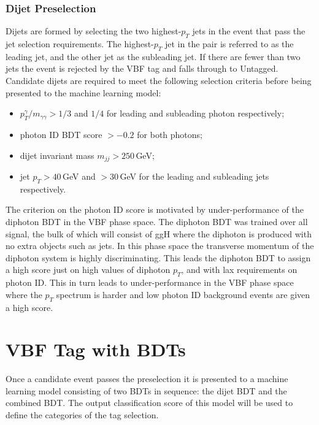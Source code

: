 \subsubsection{Dijet Preselection}
Dijets are formed by selecting the two highest-$p_T$ jets in the event that pass the jet selection requirements. The highest-$p_T$ jet in the pair is referred to as the leading jet, and the other jet as the subleading jet. If there are fewer than two jets the event is rejected by the VBF tag and falls through to Untagged. 
Candidate dijets are required to meet the following selection criteria before being presented to the machine learning model:
\begin{itemize}[noitemsep]
    \item $p^{\gamma}_{T}/m_{\gamma\gamma} > 1/3$ and $1/4$ for leading and subleading photon respectively;
    \item photon ID BDT score $> -0.2$ for both photons;
    \item dijet invariant mass $m_{jj} > 250$\,GeV;
    \item jet $p_{T} > 40$\,GeV and $> 30$\,GeV for the leading and subleading jets respectively.
\end{itemize}

The criterion on the photon ID score is motivated by under-performance of the diphoton BDT in the VBF phase space. 
The diphoton BDT was trained over all signal, the bulk of which will consist of ggH where the diphoton is produced with no extra objects such as jets. 
In this phase space the transverse momentum of the diphoton system is highly discriminating. 
This leads the diphoton BDT to assign a high score just on high values of diphoton $p_T$, and with lax requirements on photon ID. 
This in turn leads to under-performance in the VBF phase space where the $p_T$ spectrum is harder and low photon ID background events are given a high score. 








\section{VBF Tag with BDTs}
Once a candidate event passes the preselection it is presented to a machine learning model consisting of two BDTs in sequence: the dijet BDT and the combined BDT. 
The output classification score of this model will be used to define the categories of the tag selection. 

